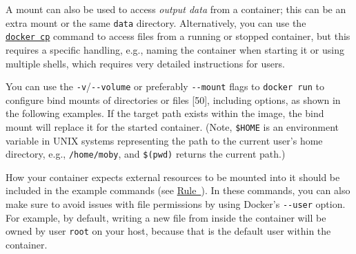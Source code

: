 \documentclass[10pt,letterpaper]{article}
\newenvironment{Shaded}{\begin{snugshade}}{\end{snugshade}}
\newcommand{\BuiltInTok}[1]{#1}
\newcommand{\CommentTok}[1]{\textcolor[rgb]{0.56,0.35,0.01}{\textit{#1}}}
\newcommand{\ExtensionTok}[1]{#1}
\newcommand{\NormalTok}[1]{#1}
\newcommand{\VariableTok}[1]{\textcolor[rgb]{0.00,0.00,0.00}{#1}}
\begin{document}
A mount can also be used to access \emph{output data} from a container;
this can be an extra mount or the same \texttt{data} directory.
Alternatively, you can use the
\href{https://docs.docker.com/engine/reference/commandline/cp/}{\texttt{docker\ cp}}
command to access files from a running or stopped container, but this
requires a specific handling, e.g., naming the container when starting
it or using multiple shells, which requires very detailed instructions
for users.

You can use the \texttt{-v}/\texttt{-\/-volume} or preferably
\texttt{-\/-mount} flags to \texttt{docker\ run} to configure bind
mounts of directories or files {[}50{]}, including options, as shown in
the following examples. If the target path exists within the image, the
bind mount will replace it for the started container. (Note,
\texttt{\$HOME} is an environment variable in UNIX systems representing
the path to the current user's home directory, e.g.,
\texttt{/home/moby}, and \texttt{\$(pwd)} returns the current path.)

\footnotesize

\begin{Shaded}
\end{Shaded}

\normalsize

How your container expects external resources to be mounted into it
should be included in the example commands (see
\hyperref[{rule:document}]{Rule~}). In these
commands, you can also make sure to avoid issues with file permissions
by using Docker's \texttt{-\/-user} option. For example, by default,
writing a new file from inside the container will be owned by user
\texttt{root} on your host, because that is the default user within the
container.
\end{document}
